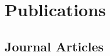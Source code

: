 \documentclass[11pt,letterpaper]{report} %
\newcommand{\listitemspace}{0.25em}
\renewenvironment{itemize}
{\begin{list}{}{\setlength{\leftmargin}{0em}
                \setlength{\parskip}{0em}
                \setlength{\itemsep}{\listitemspace}
                \setlength{\parsep}{\listitemspace}}}
{\end{list}}
\begin{document}












    \section*{Publications}

    \subsection*{Journal Articles}
\end{document}
